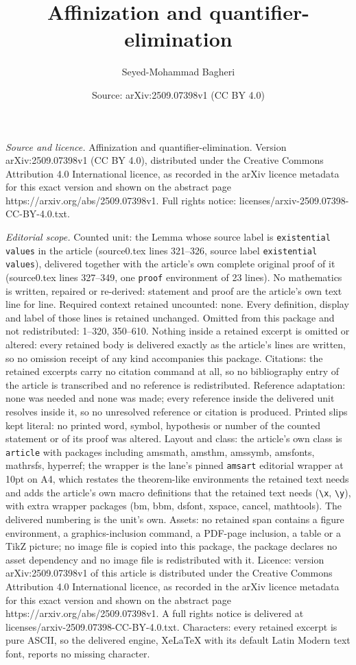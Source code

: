 \documentclass[10pt,a4paper]{amsart}
\title[Affinization and quantifier-elimination]{Affinization and quantifier-elimination}
\author{Seyed-Mohammad Bagheri}
\date{Source: arXiv:2509.07398v1 (CC BY 4.0)}
\begin{document}
\maketitle

\noindent\emph{Source and licence.} Affinization and quantifier-elimination. Version arXiv:2509.07398v1 (CC BY 4.0), distributed under the Creative Commons Attribution 4.0 International licence, as recorded in the arXiv licence metadata for this exact version and shown on the abstract page https://arxiv.org/abs/2509.07398v1. Full rights notice: licenses/arxiv-2509.07398-CC-BY-4.0.txt.\par\smallskip

\noindent\textit{Editorial scope.} Counted unit: the Lemma whose source label is \texttt{existential values} in the article (source0.tex lines 321--326, source label \texttt{existential values}), delivered together with the article's own complete original proof of it (source0.tex lines 327--349, one \texttt{proof} environment of 23 lines). No mathematics is written, repaired or re-derived: statement and proof are the article's own text line for line. Required context retained uncounted: none. Every definition, display and label of those lines is retained unchanged. Omitted from this package and not redistributed: 1--320, 350--610. Nothing inside a retained excerpt is omitted or altered: every retained body is delivered exactly as the article's lines are written, so no omission receipt of any kind accompanies this package. Citations: the retained excerpts carry no citation command at all, so no bibliography entry of the article is transcribed and no reference is redistributed. Reference adaptation: none was needed and none was made; every reference inside the delivered unit resolves inside it, so no unresolved reference or citation is produced. Printed slips kept literal: no printed word, symbol, hypothesis or number of the counted statement or of its proof was altered. Layout and class: the article's own class is \texttt{article} with packages including amsmath, amsthm, amssymb, amsfonts, mathrsfs, hyperref; the wrapper is the lane's pinned \texttt{amsart} editorial wrapper at 10pt on A4, which restates the theorem-like environments the retained text needs and adds the article's own macro definitions that the retained text needs (\texttt{\textbackslash x}, \texttt{\textbackslash y}), with extra wrapper packages (bm, bbm, dsfont, xspace, cancel, mathtools). The delivered numbering is the unit's own. Assets: no retained span contains a figure environment, a graphics-inclusion command, a PDF-page inclusion, a table or a TikZ picture; no image file is copied into this package, the package declares no asset dependency and no image file is redistributed with it. Licence: version arXiv:2509.07398v1 of this article is distributed under the Creative Commons Attribution 4.0 International licence, as recorded in the arXiv licence metadata for this exact version and shown on the abstract page https://arxiv.org/abs/2509.07398v1. A full rights notice is delivered at licenses/arxiv-2509.07398-CC-BY-4.0.txt. Characters: every retained excerpt is pure ASCII, so the delivered engine, XeLaTeX with its default Latin Modern text font, reports no missing character.
\end{document}
